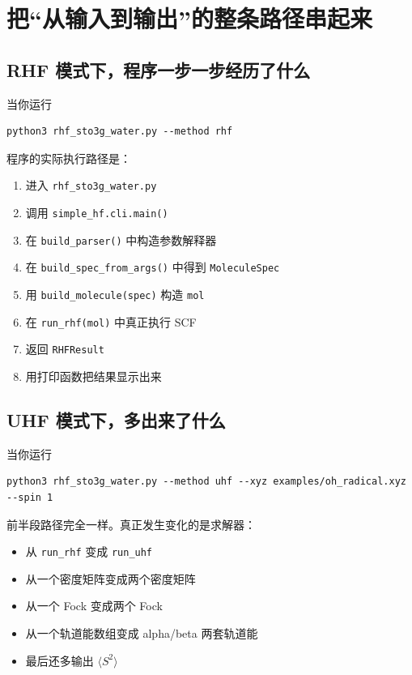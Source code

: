 \documentclass[UTF8,11pt,fontset=fandol]{ctexbook}
\begin{document}
\chapter{把“从输入到输出”的整条路径串起来}

\section{RHF 模式下，程序一步一步经历了什么}

当你运行
\begin{lstlisting}[style=bashstyle]
python3 rhf_sto3g_water.py --method rhf
\end{lstlisting}

程序的实际执行路径是：
\begin{enumerate}[label=\arabic*.]
  \item 进入 \texttt{rhf\_sto3g\_water.py}
  \item 调用 \texttt{simple\_hf.cli.main()}
  \item 在 \texttt{build\_parser()} 中构造参数解释器
  \item 在 \texttt{build\_spec\_from\_args()} 中得到 \texttt{MoleculeSpec}
  \item 用 \texttt{build\_molecule(spec)} 构造 \texttt{mol}
  \item 在 \texttt{run\_rhf(mol)} 中真正执行 SCF
  \item 返回 \texttt{RHFResult}
  \item 用打印函数把结果显示出来
\end{enumerate}

\section{UHF 模式下，多出来了什么}

当你运行
\begin{lstlisting}[style=bashstyle]
python3 rhf_sto3g_water.py --method uhf --xyz examples/oh_radical.xyz --spin 1
\end{lstlisting}

前半段路径完全一样。真正发生变化的是求解器：
\begin{itemize}
  \item 从 \texttt{run\_rhf} 变成 \texttt{run\_uhf}
  \item 从一个密度矩阵变成两个密度矩阵
  \item 从一个 Fock 变成两个 Fock
  \item 从一个轨道能数组变成 alpha/beta 两套轨道能
  \item 最后还多输出 $\langle S^2\rangle$
\end{itemize}
\end{document}

